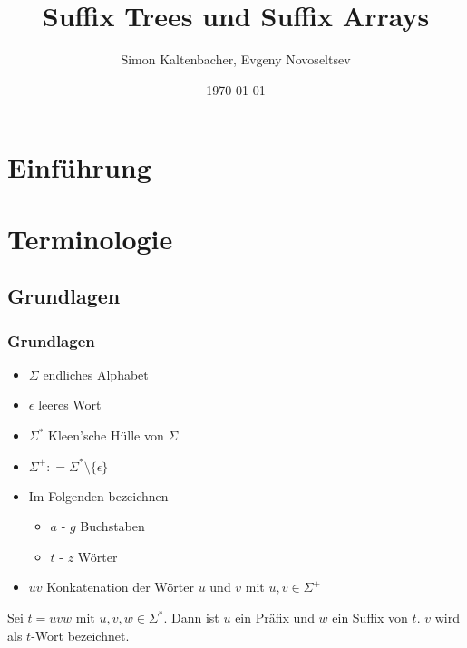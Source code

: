 \documentclass{beamer}
\title{Suffix Trees und Suffix Arrays}
\author{Simon Kaltenbacher, Evgeny Novoseltsev}
\date{\today}
\newcommand{\coloneqq}{\mathrel{\mathop:}=}
\begin{document}
\frame{\titlepage}


\section{Einführung}

\section{Terminologie}

\subsection{Grundlagen}

\begin{frame}
\frametitle{Grundlagen}
\begin{itemize}
    \item $\Sigma$ endliches Alphabet
    \item $\epsilon$ leeres Wort
    \item $\Sigma^*$ Kleen'sche Hülle von $\Sigma$
    \item $\Sigma^+ \coloneqq \Sigma^* \setminus \{\epsilon\}$
    \item Im Folgenden bezeichnen
    \begin{itemize}
        \item $a$ - $g$ Buchstaben
        \item $t$ - $z$ Wörter
    \end{itemize}
    \item $uv$ Konkatenation der Wörter $u$ und $v$ mit $u, v \in \Sigma^+$
\end{itemize}
\begin{definition}
    Sei $t = uvw$ mit $u, v, w \in \Sigma^*$. Dann ist $u$ ein Präfix und $w$ ein Suffix von $t$. $v$ wird als $t$-Wort bezeichnet.
\end{definition}
\end{frame}
\end{document}
